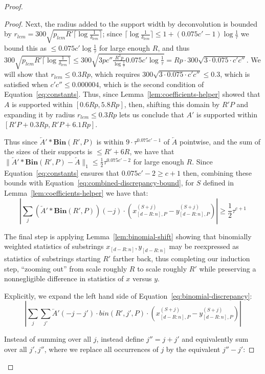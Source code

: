 \documentclass[10pt,a4paper]{amsart}
\newcommand{\Bin}[2]{\textbf{Bin}(#1,#2)}
\begin{document}
\begin{proof}
\begin{proof}
    Next, the radius added to the support width by deconvolution is bounded by $r_{lem}=300\sqrt{p_{lem}R'\lceil\log\frac{1}{\delta_{lem}}\rceil}$; since $\lceil\log\frac{1}{\delta_{lem}}\rceil\leq 1+(0.075c'-1)\log\frac{1}{\tau}$ we bound this as $\leq 0.075c'\log\frac{1}{\tau}$ for large enough $R$, and thus $300\sqrt{p_{lem}R'\lceil\log\frac{1}{\delta_{lem}}\rceil}\leq 300\sqrt{3p c''\frac{R^2 p}{\log\frac{1}{\tau}} 0.075c'\log\frac{1}{\tau}}=Rp\cdot 300\sqrt{3\cdot 0.075\cdot c'c''}$. We will show that $r_{lem}\leq 0.3Rp$, which requires $300\sqrt{3\cdot 0.075\cdot c'c''}\leq 0.3$, which is satisfied when $c'c''\leq 0.000004$, which is the second condition of Equation~\ref{eq:constants}. Thus, since Lemma~\ref{lem:coefficients-helper} showed that $A$ is supported within $[0.6Rp,5.8Rp]$, then, shifting this domain by $R'P$ and expanding it by radius $r_{lem}\leq 0.3Rp$ lets us conclude that $A'$ is supported within $[R'P+0.3Rp,R'P+6.1Rp]$.

    Thus since $\overleftarrow{A}'\ast \Bin{R'}{P}$ is within $9\cdot \tau^{0.075c'-1}$ of $\overleftarrow{A}$ pointwise, and the sum of the sizes of their supports is $\leq R'+6R$, we have that $\|\overleftarrow{A}'\ast \Bin{R'}{P}-\overleftarrow{A}\|_1\leq \frac{1}{2}\tau^{0.075c'-2}$ for large enough $R$. Since Equation~\ref{eq:constants} ensures that $0.075c'-2\geq c+1$ then, combining these bounds with Equation~\ref{eq:combined-discrepancy-bound}, for $S$ defined in Lemma~\ref{lem:coefficients-helper} we have that: \begin{equation}\label{eq:binomial-discrepancy}|\sum_{j} (\overleftarrow{A}'\ast \Bin{R'}{P})(-j)\cdot(x_{[d-R:n],P}^{(S+j)}-y_{[d-R:n],P}^{(S+j)})|\geq \frac{1}{2}\tau^{c+1}\end{equation}

    The final step is applying Lemma~\ref{lem:binomial-shift} showing that binomially weighted statistics of substrings $x_{[d-R:n]},y_{[d-R:n]}$ may be reexpressed as statistics of substrings starting $R'$ farther back, thus completing our induction step, ``zooming out'' from scale roughly $R$ to scale roughly $R'$ while preserving a nonnegligible difference in statistics of $x$ versus $y$.

    Explicitly, we expand the left hand side of Equation~\ref{eq:binomial-discrepancy}:
\[|\sum_{j} \sum_{j'} \overleftarrow{A}'(-j-j')\cdot bin(R',j',P)\cdot(x_{[d-R:n],P}^{(S+j)}-y_{[d-R:n],P}^{(S+j)})|\]


    Instead of summing over all $j$, instead define $j''=j+j'$ and equivalently sum over all $j',j''$, where we replace all occurrences of $j$ by the equivalent $j''-j'$:


\end{proof}
\end{proof}
\end{document}
